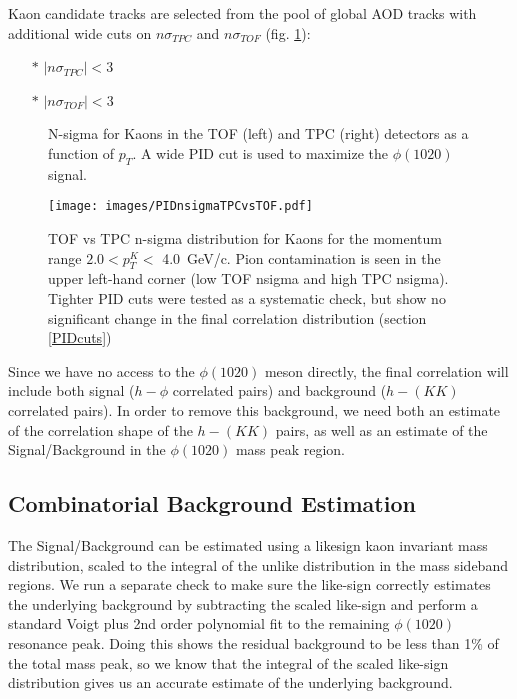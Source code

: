\documentclass[ALICE,manyauthors]{ALICE_analysis_notes}
\begin{document}
Kaon candidate tracks are selected from the pool of global AOD tracks with additional wide cuts on $n\sigma_{TPC}$ and $n\sigma_{TOF}$ (fig. \ref{nsigma}):

\begin{itemize}
	\item[$\ast$] $|n\sigma_{TPC}| < 3$
	\item[$\ast$] $|n\sigma_{TOF}| < 3$
\end{itemize}

\begin{figure}[ht]
\centering
\begin{subfigure}{
\texttt{[image: images/nsigmatof\_track1024.pdf]}}
\end{subfigure}
\begin{subfigure}{
\texttt{[image: images/nsigmatpc\_track1024.pdf]}}
\end{subfigure}
\caption{N-sigma for Kaons in the TOF (left) and TPC (right) detectors as a function of $p_{T}$. A wide PID cut is used to maximize the $\phi(1020)$ signal.}
\label{nsigma}
\end{figure}

\begin{figure}[ht]
\centering
\texttt{[image: images/PIDnsigmaTPCvsTOF.pdf]}
\caption{TOF vs TPC n-sigma distribution for Kaons for the momentum range $2.0 < p_{T}^{K} <$ \SI{4.0}{GeV/c}. Pion contamination is seen in the upper left-hand corner (low TOF nsigma and high TPC nsigma). Tighter PID cuts were tested as a systematic check, but show no significant change in the final correlation distribution (section \ref{PIDcuts})}
\label{nsigmaTPCvTOF}
\end{figure}
 
 Since we have no access to the $\phi(1020)$ meson directly, the final correlation will include both signal ($h-\phi$ correlated pairs) and background ($h-(KK)$ correlated pairs).  In order to remove this background, we need both an estimate of the correlation shape of the $h-(KK)$ pairs, as well as an estimate of the Signal/Background in the $\phi(1020)$ mass peak region.
 
 \subsection{Combinatorial Background Estimation}
 The Signal/Background can be estimated using a likesign kaon invariant mass distribution, scaled to the integral of the unlike distribution in the mass sideband regions.  We run a separate check to make sure the like-sign correctly estimates the underlying background by subtracting the scaled like-sign and perform a standard Voigt plus 2nd order polynomial fit to the remaining $\phi(1020)$ resonance peak.  Doing this shows the residual background to be less than 1\% of the total mass peak, so we know that the integral of the scaled like-sign distribution gives us an accurate estimate of the underlying background.
 
\end{document}

